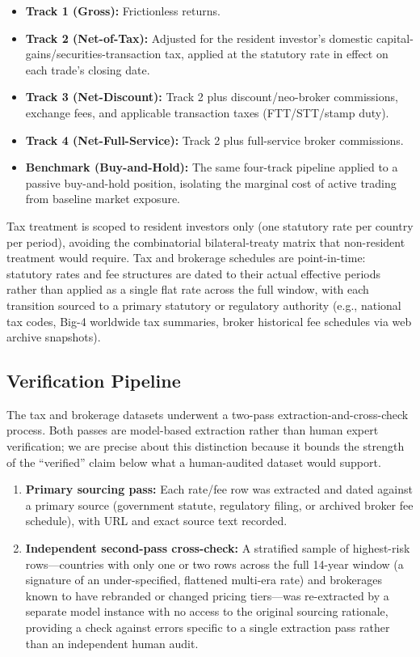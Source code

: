 \documentclass[11pt]{article}
\begin{document}
\begin{itemize}
    \item \textbf{Track 1 (Gross):} Frictionless returns.
    \item \textbf{Track 2 (Net-of-Tax):} Adjusted for the resident investor's domestic capital-gains/securities-transaction tax, applied at the statutory rate in effect on each trade's closing date.
    \item \textbf{Track 3 (Net-Discount):} Track 2 plus discount/neo-broker commissions, exchange fees, and applicable transaction taxes (FTT/STT/stamp duty).
    \item \textbf{Track 4 (Net-Full-Service):} Track 2 plus full-service broker commissions.
    \item \textbf{Benchmark (Buy-and-Hold):} The same four-track pipeline applied to a passive buy-and-hold position, isolating the marginal cost of active trading from baseline market exposure.
\end{itemize}

Tax treatment is scoped to resident investors only (one statutory rate per country per period), avoiding the combinatorial bilateral-treaty matrix that non-resident treatment would require. Tax and brokerage schedules are point-in-time: statutory rates and fee structures are dated to their actual effective periods rather than applied as a single flat rate across the full window, with each transition sourced to a primary statutory or regulatory authority (e.g., national tax codes, Big-4 worldwide tax summaries, broker historical fee schedules via web archive snapshots).

\subsection{Verification Pipeline}
\label{sec:verification}

The tax and brokerage datasets underwent a two-pass extraction-and-cross-check process. Both passes are model-based extraction rather than human expert verification; we are precise about this distinction because it bounds the strength of the ``verified'' claim below what a human-audited dataset would support.

\begin{enumerate}
    \item \textbf{Primary sourcing pass:} Each rate/fee row was extracted and dated against a primary source (government statute, regulatory filing, or archived broker fee schedule), with URL and exact source text recorded.
    \item \textbf{Independent second-pass cross-check:} A stratified sample of highest-risk rows---countries with only one or two rows across the full 14-year window (a signature of an under-specified, flattened multi-era rate) and brokerages known to have rebranded or changed pricing tiers---was re-extracted by a separate model instance with no access to the original sourcing rationale, providing a check against errors specific to a single extraction pass rather than an independent human audit.
\end{enumerate}
\end{document}
